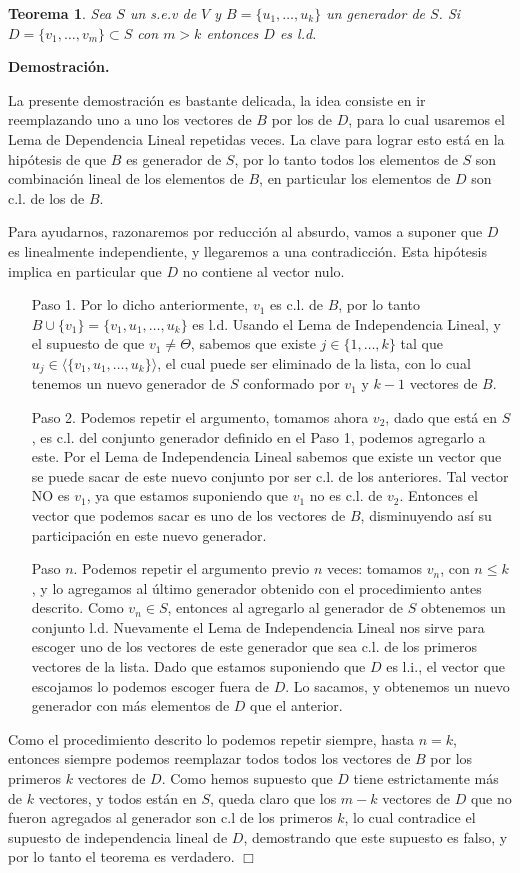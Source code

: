 \documentclass[12pt]{book}
\newtheorem{teo}{Teorema}
\begin{document}
\begin{teo}\label{teo:<}
Sea $S$ un s.e.v de $V$ y $B=\{u_1,\dots,u_k\}$ un generador de $S$.
Si $D=\{v_1,\dots,v_m\}\subset S$ con $m>k$ entonces $D$ es l.d.
\end{teo}
{\bf Demostración.} {
La presente demostración es bastante delicada, la idea consiste en ir reemplazando uno a uno los vectores de $B$  por los de $D$, para lo cual usaremos el Lema de Dependencia Lineal repetidas veces.
La clave para lograr esto está en la hipótesis de que $B$ es generador de $S$, por lo tanto todos los elementos de $S$ son combinación lineal de los elementos de $B$, en particular los elementos de $D$ son c.l. de los de $B$.

Para ayudarnos, razonaremos por reducción al absurdo, vamos a suponer que $D$ es linealmente independiente, y llegaremos a una contradicción.
Esta hipótesis implica en particular que $D$ no contiene al vector nulo.
\begin{itemize}
\item[Paso 1.] Por lo dicho anteriormente, $v_1$ es c.l. de $B$, por lo tanto $B\cup\{v_1\}=\{v_1,u_1,\dots,u_k\}$ es l.d.
Usando el Lema de Independencia Lineal, y el supuesto de que $v_1\not=\Theta$, sabemos que existe $j\in\{1,\dots,k\}$ tal que $u_j\in\langle\{v_1,u_1,\dots,u_k\}\rangle$, el cual puede ser eliminado de la lista, con lo cual tenemos un nuevo generador de $S$ conformado por $v_1$ y $k-1$ vectores de $B$.
\item[Paso 2.] Podemos repetir el argumento, tomamos ahora $v_2$, dado que está en $S$, es c.l. del conjunto generador definido en el Paso 1, podemos agregarlo a este.
Por el Lema de Independencia Lineal sabemos que existe un vector que se puede sacar de este nuevo conjunto por ser c.l. de los anteriores.
Tal vector NO es $v_1$, ya que estamos suponiendo que $v_1$ no es c.l. de $v_2$.
Entonces el vector que podemos sacar es uno de los vectores de $B$, disminuyendo así su participación en este nuevo generador.
\item[Paso $n$.] Podemos repetir el argumento previo $n$ veces: tomamos $v_n$, con $n\le k$, y lo agregamos al último generador obtenido con el procedimiento antes descrito.
Como $v_n\in S$, entonces al agregarlo al generador de $S$ obtenemos un conjunto l.d. Nuevamente el Lema de Independencia Lineal nos sirve para escoger uno de los vectores de este generador que sea c.l. de los primeros vectores de la lista.
Dado que estamos suponiendo que $D$ es l.i., el vector que escojamos lo podemos escoger fuera de $D$.
Lo sacamos, y obtenemos un nuevo generador con más elementos de $D$ que el anterior.
\end{itemize}
Como el procedimiento descrito lo podemos repetir siempre, hasta $n=k$, entonces siempre podemos reemplazar todos todos los vectores de $B$ por los primeros $k$ vectores de $D$. 
Como hemos supuesto que $D$ tiene estrictamente más de $k$ vectores, y todos están en $S$, queda claro que los $m-k$ vectores de $D$ que no fueron agregados al generador son c.l de los primeros $k$, lo cual contradice el supuesto de independencia lineal de $D$, demostrando que este supuesto es falso, y por lo tanto el teorema es verdadero. \hfill $\Box$
}
\end{document}
